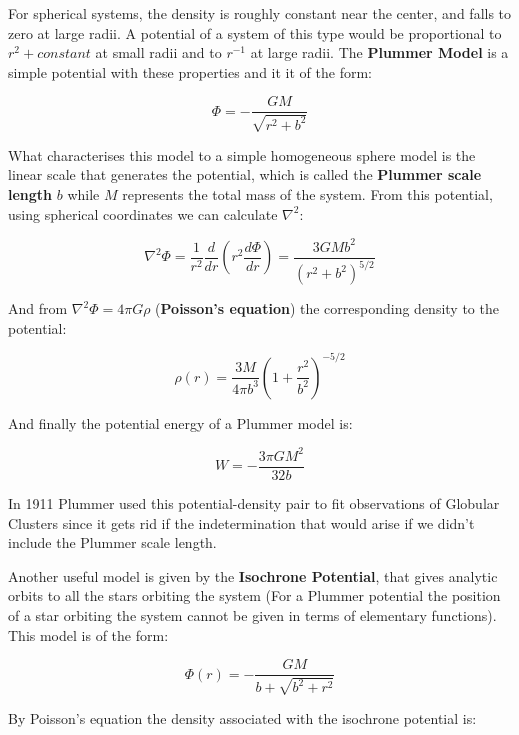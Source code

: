For spherical systems, the density is roughly constant near the center, and falls to zero at large radii. A potential of a system of this type would be proportional to $r^{2} + constant$ at small radii and to $r^{-1}$ at large radii. The \textbf{Plummer Model} is a simple potential with these properties and it it of the form:

\begin{equation}
\Phi=-\frac{GM}{\sqrt{r^{2}+b^{2}}}
\end{equation}

What characterises this model to a simple homogeneous sphere model is the linear scale that generates the potential, which is called the \textbf{Plummer scale length} $b$ while $M$ represents the total mass of the system. From this potential, using spherical coordinates we can calculate $\nabla^{2}$:

\begin{equation}
\nabla^{2}\Phi=\frac{1}{r^{2}}\frac{d}{dr}\left(r^{2}\frac{d\Phi}{dr}\right)=\frac{3GMb^{2}}{\left(r^{2}+b^{2}\right)^{5/2}}
\end{equation}

And from $\nabla^{2}\Phi=4\pi G\rho$ (\textbf{Poisson's equation}) the corresponding density to the potential:

\begin{equation}
\rho(r)=\frac{3M}{4\pi b^{3}}\left(1+\frac{r^{2}}{b^{2}}\right)^{-5/2}
\end{equation}

And finally the potential energy of a Plummer model is:

\begin{equation}
W=-\frac{3\pi GM^{2}}{32b}
\end{equation}

In 1911 Plummer used this potential-density pair to fit observations of Globular Clusters since it gets rid if the indetermination that would arise if we didn't include the Plummer scale length.

Another useful model is given by the \textbf{Isochrone Potential}, that gives analytic orbits to all the stars orbiting the system (For a Plummer potential the position of a star orbiting the system cannot be given in terms of elementary functions). This model is of the form:

\begin{equation}
\Phi(r)=-\frac{GM}{b+\sqrt{b^{2}+r^{2}}}
\end{equation}

By Poisson's equation the density associated with the isochrone potential is:

